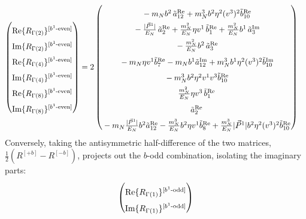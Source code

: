 \begin{widetext}
\begin{align}
\begin{pmatrix}
        \rule{0pt}{16pt} \text{Re}\{ R_{\Gamma(2)}\}^{[b^{1}\text{-even}]} \\
        \rule{0pt}{16pt} \text{Im}\{ R_{\Gamma(2)}\}^{[b^{1}\text{-even}]} \\
        \rule{0pt}{16pt} \text{Re}\{ R_{\Gamma(4)}\}^{[b^{1}\text{-even}]} \\
        \rule{0pt}{16pt} \text{Im}\{ R_{\Gamma(4)}\}^{[b^{1}\text{-even}]} \\
        \rule{0pt}{16pt} \text{Re}\{ R_{\Gamma(8)}\}^{[b^{1}\text{-even}]} \\
        \rule{0pt}{16pt} \text{Im}\{ R_{\Gamma(8)}\}^{[b^{1}\text{-even}]}
    \end{pmatrix} &= 2\begin{pmatrix}
     \rule{0pt}{16pt}  -  \mN  \bvec^2 \, \tilde a^{\text{Re}}_{12}+  \mN^3  \bvec^2 \eta^2 (v^3)^2 \tilde b^{\text{Re}}_{10} \\
      \rule{0pt}{16pt}  -\frac{|\vec{P}^1|}{E_N}\, \tilde a^{\text{Re}}_2+ \frac{\mN^2}{E_N} \eta v^1\, \tilde b^{\text{Re}}_1 + \frac{\mN^2}{E_N} \bvec^1\, \tilde a^{\text{Im}}_3\\
      \rule{0pt}{16pt}  -  \frac{\mN^2}{E_N} \bvec^2\, \tilde a^{\text{Re}}_3
		\\
      \rule{0pt}{16pt} - \mN \eta v^1  \tilde b^{\text{Re}}_7
		-  \mN   \bvec^1  \tilde a^{\text{Im}}_{12}+ \mN^3  \bvec^1 \eta^2 (v^3)^2 \tilde b^{\text{Im}}_{10}\\
      \rule{0pt}{16pt} -\mN^3 \bvec^2 \eta^2 v^1 v^3\tilde b^{\text{Re}}_{10}\\
      \rule{0pt}{16pt} \frac{\mN^2}{E_N} \eta v^3\, \tilde b^{\text{Re}}_1 \\
      \rule{0pt}{16pt}  \tilde a^{\text{Re}}_2\\
      \rule{0pt}{16pt} -  \mN  \frac{|\vec{P}^1|}{E_N} \bvec^2  \tilde a^{\text{Re}}_{12}- \frac{  \mN^3}{E_N}  \bvec^2 \eta v^1  \tilde b^{\text{Re}}_8+ \frac{ \mN^3}{E_N}  |\vec{P}^1| \bvec^2 \eta^2 (v^3)^2 \tilde b^{\text{Re}}_{10}
    \end{pmatrix}
\end{align}
Conversely, taking the antisymmetric half-difference of the two matrices, $\frac{1}{2}\left(R^{[+b]} - R^{[-b]}\right)$, projects out the $b$-odd combination, isolating the imaginary parts:
\begin{align}
    \begin{pmatrix}
        \rule{0pt}{16pt} \text{Re}\{ R_{\Gamma(1)}\}^{[b^{1}\text{-odd}]} \\
        \rule{0pt}{16pt} \text{Im}\{ R_{\Gamma(1)}\}^{[b^{1}\text{-odd}]} \\

\end{pmatrix}
\end{align}
\end{widetext}
